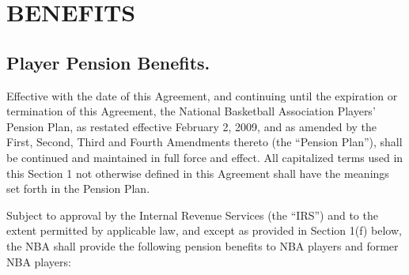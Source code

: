 \documentclass[
]{book}
\begin{document}
\hypertarget{benefits}{%
\chapter{BENEFITS}\label{benefits}}

\hypertarget{player-pension-benefits.}{%
\section{Player Pension Benefits.}\label{player-pension-benefits.}}

Effective with the date of this Agreement, and continuing until the expiration or termination of this Agreement, the National Basketball Association Players' Pension Plan, as restated effective February 2, 2009, and as amended by the First, Second, Third and Fourth Amendments thereto (the ``Pension Plan''), shall be continued and maintained in full force and effect. All capitalized terms used in this Section 1 not otherwise defined in this Agreement shall have the meanings set forth in the Pension
Plan.

Subject to approval by the Internal Revenue Services (the ``IRS'') and to the extent permitted by applicable law, and except as provided in Section 1(f) below, the NBA shall provide the following pension benefits to NBA players and former NBA players:
\end{document}
